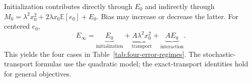 Initialization contributes directly through $E_0$ and indirectly through
$M_0=\lambda^2x_0^2+2\lambda x_0\mathbb E[e_0]+E_0$.
Bias may increase or decrease the latter. For centered $e_0$,
\begin{equation}
\label{eq:quadratic-three-contributions}
E_\infty
=\underbrace{E_0}_{\text{initialization}}
+\underbrace{A\lambda^2x_0^2}_{\text{transport}}
+\underbrace{AE_0}_{\text{interaction}}.
\end{equation}
This yields the four cases in Table~\ref{tab:four-error-regimes}.
The stochastic-transport formulas use the quadratic model; the
exact-transport identities hold for general objectives.
